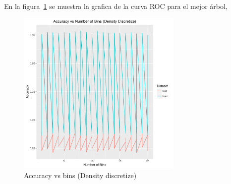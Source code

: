 En la figura~\ref{fig:6f} se muestra la grafica de la curva ROC para el mejor árbol,

\begin{figure}
  \centering
  \includegraphics[width = 8cm]{6f.pdf}
  \caption{Accuracy vs bins (Density discretize)}
  \label{fig:6f}
\end{figure}




